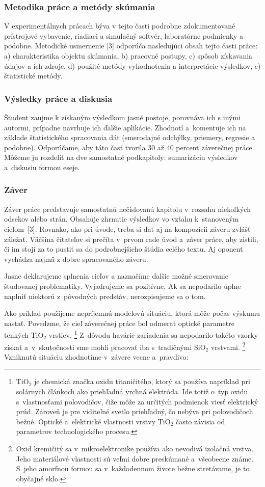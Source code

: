 \subsubsection*{\normalsize Metodika práce a metódy skúmania}
V experimentálnych prácach býva v tejto časti podrobne zdokumentované prístrojové vybavenie, riadiaci a simulačný softvér, laboratórne podmienky a podobne. Metodické usmernenie [3] odporúča nasledujúci obsah tejto časti práce: a) charakteristika objektu skúmania, b) pracovné postupy, c) spôsob získavania údajov a ich zdroje, d) použité metódy vyhodnotenia a interpretácie výsledkov, e) štatistické metódy.

\subsubsection*{\normalsize Výsledky práce a diskusia}
Študent zaujme k získaným výsledkom jasné postoje,
porovnáva ich s inými autormi, prípadne navrhuje ich ďalšie aplikácie.
Zhodnotí a~komentuje ich na základe štatistického spracovania dát (smerodajné odchýlky, priemery, regresie a podobne).
Odporúčame, aby táto časť tvorila 30 až 40 percent záverečnej práce.
Môžeme ju rozdeliť na dve samostatné podkapitoly: sumarizáciu výsledkov a~diskusiu formou eseje.

\subsubsection{Záver}
Záver práce predstavuje samostatnú nečíslovanú kapitolu
v~rozsahu niekoľkých odsekov alebo strán.
Obsahuje zhrnutie výsledkov vo vzťahu k~stanoveným cieľom~[3].
Rovnako, ako pri úvode, treba si dať
aj na kompozícii záveru zvlášť záležať.
Väčšina čitateľov si prečíta v~prvom rade úvod a~záver práce,
aby zistili, či im stojí za to pustiť sa do podrobnejšieho
štúdia celého textu.
Aj oponent vychádza najmä z dobre spracovaného záveru.

Jasne deklarujeme splnenia cieľov a naznačíme ďalšie možné smerovanie študovanej problematiky. Vyjadrujeme sa pozitívne. Ak sa nepodarilo úplne naplniť niektorú z~pôvodných predstáv, nerozpisujeme sa o tom.

Ako príklad použijeme nepríjemnú modelovú situáciu,
ktorá môže počas výskumu nastať.
Povedzme, že cieľ záverečnej práce bol odmerať
optické parametre tenkých TiO$_2$ vrstiev.%
\footnote{TiO$_2$ je chemická značka oxidu titaničitého,
ktorý sa používa napríklad pri solárnych článkoch
ako priehľadná vrchná elektróda.
Ide totiž o~typ oxidu s~vlastnosťami polovodičov,
čiže môže za určitých podmienok viesť elektrický prúd.
Zároveň je pre viditeľné svetlo priehľadný,
čo nebýva pri polovodičoch bežné.
Optické a~elektrické vlastnosti vrstvy TiO$_2$
často závisia od parametrov technologického procesu.}
Z~dôvodu havárie zariadenia sa nepodarilo takéto vzorky získať
a~v~skutočnosti sme mohli pracovať iba
s~tradičnými SiO$_2$ vrstvami.%
\footnote{Oxid kremičitý sa v~mikroelektronike používa
ako nevodivá izolačná vrstva.
Jeho materiálové vlastnosti sú veľmi dobre preskúmané
a~všeobecne známe.
S~jeho amorfnou formou sa v~každodennom živote bežne stretávame,
je to obyčajné sklo.}
Vzniknutú situáciu zhodnotíme v~závere vecne a~pravdivo:

